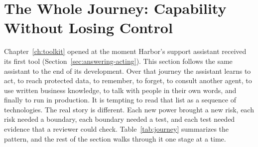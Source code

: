 
\section{The Whole Journey: Capability Without Losing Control}
\label{sec:journey}

Chapter~\ref{ch:toolkit} opened at the moment Harbor's support assistant received its first tool (Section~\ref{sec:answering-acting}). This section follows the same assistant to the end of its development. Over that journey the assistant learns to act, to reach protected data, to remember, to forget, to consult another agent, to use written business knowledge, to talk with people in their own words, and finally to run in production. It is tempting to read that list as a sequence of technologies. The real story is different. Each new power brought a new risk, each risk needed a boundary, each boundary needed a test, and each test needed evidence that a reviewer could check. Table~\ref{tab:journey} summarizes the pattern, and the rest of the section walks through it one stage at a time.


